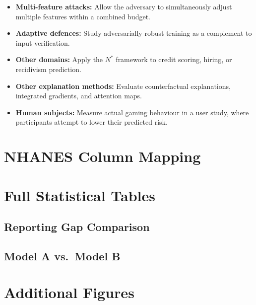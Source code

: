 \documentclass[12pt, a4paper, oneside]{report}
\theoremstyle{definition}
\begin{document}
\begin{itemize}
  \item \textbf{Multi-feature attacks:} Allow the adversary to simultaneously
        adjust multiple features within a combined budget.
  \item \textbf{Adaptive defences:} Study adversarially robust training as
        a complement to input verification.
  \item \textbf{Other domains:} Apply the $N^*$ framework to credit scoring,
        hiring, or recidivism prediction.
  \item \textbf{Other explanation methods:} Evaluate counterfactual
        explanations, integrated gradients, and attention maps.
  \item \textbf{Human subjects:} Measure actual gaming behaviour in a user
        study, where participants attempt to lower their predicted risk.
\end{itemize}

\appendix

\chapter{NHANES Column Mapping}
\label{app:columns}



\chapter{Full Statistical Tables}
\label{app:stats}

\section{Reporting Gap Comparison}


\section{Model A vs.\ Model B}


\chapter{Additional Figures}
\label{app:figures}
\end{document}
